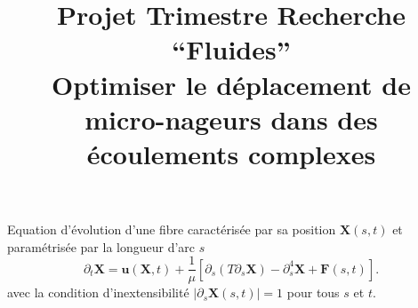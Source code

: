 \documentclass[a4paper,11pt]{article}
\begin{document}
\title{Projet Trimestre Recherche ``Fluides''\\ {\large Optimiser le déplacement de micro-nageurs dans des écoulements complexes}}
\date{\empty}
\maketitle

Equation d'évolution d'une fibre caractérisée par sa position $\bm X(s,t)$ et paramétrisée par la longueur d'arc $s$ 
\begin{equation}
	\partial_t \bm X = \bm u(\bm X,t) +\frac{1}{\mu} \left[ \partial_s(T\partial_s \bm X) - \partial_s^4 \bm X + \bm F(s,t) \right].
\end{equation}
avec la condition d'inextensibilité $|\partial_s\bm X(s,t)| = 1$ pour tous $s$ et $t$.
\end{document}
